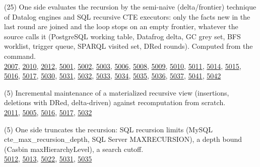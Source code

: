 \documentclass[10pt]{article}
\begin{document}
\begin{description}[leftmargin=1.2em,itemsep=2pt]
\item[\texttt{semi-naive}\label{tag:semi-naive}] (25) One side evaluates the recursion by the semi-naive (delta/frontier) technique of Datalog engines and SQL recursive CTE executors: only the facts new in the last round are joined and the loop stops on an empty frontier, whatever the source calls it (PostgreSQL working table, Datafrog delta, GC grey set, BFS worklist, trigger queue, SPARQL visited set, DRed rounds). Computed from the command.\\ {\small \hyperref[case:Example2007]{2007}, \hyperref[case:Example2010]{2010}, \hyperref[case:Example2012]{2012}, \hyperref[case:Example5001]{5001}, \hyperref[case:Example5002]{5002}, \hyperref[case:Example5003]{5003}, \hyperref[case:Example5006]{5006}, \hyperref[case:Example5008]{5008}, \hyperref[case:Example5009]{5009}, \hyperref[case:Example5010]{5010}, \hyperref[case:Example5011]{5011}, \hyperref[case:Example5014]{5014}, \hyperref[case:Example5015]{5015}, \hyperref[case:Example5016]{5016}, \hyperref[case:Example5017]{5017}, \hyperref[case:Example5030]{5030}, \hyperref[case:Example5031]{5031}, \hyperref[case:Example5032]{5032}, \hyperref[case:Example5033]{5033}, \hyperref[case:Example5034]{5034}, \hyperref[case:Example5035]{5035}, \hyperref[case:Example5036]{5036}, \hyperref[case:Example5037]{5037}, \hyperref[case:Example5041]{5041}, \hyperref[case:Example5042]{5042}}
\item[\texttt{view-maintenance}\label{tag:view-maintenance}] (5) Incremental maintenance of a materialized recursive view (insertions, deletions with DRed, delta-driven) against recomputation from scratch.\\ {\small \hyperref[case:Example2011]{2011}, \hyperref[case:Example5005]{5005}, \hyperref[case:Example5016]{5016}, \hyperref[case:Example5017]{5017}, \hyperref[case:Example5032]{5032}}
\item[\texttt{recursion-limit}\label{tag:recursion-limit}] (5) One side truncates the recursion: SQL recursion limits (MySQL cte\_max\_recursion\_depth, SQL Server MAXRECURSION), a depth bound (Casbin maxHierarchyLevel), a search cutoff.\\ {\small \hyperref[case:Example5012]{5012}, \hyperref[case:Example5013]{5013}, \hyperref[case:Example5022]{5022}, \hyperref[case:Example5031]{5031}, \hyperref[case:Example5035]{5035}}
\end{description}
\end{document}
